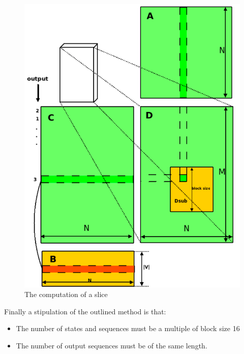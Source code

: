 \documentclass[english, paper=a4]{scrartcl}
\begin{document}
\begin{figure}[H]
\centering

\includegraphics[scale=0.3]{"slice"}
  \caption{The computation of a slice\cite{cuhmm}}
\end{figure}

Finally a stipulation of the outlined method is that:

\begin{itemize}
\item The number of states and sequences must be a multiple of block size 16
\item The number of output sequences must be of the same length.
\end{itemize}
\end{document}
